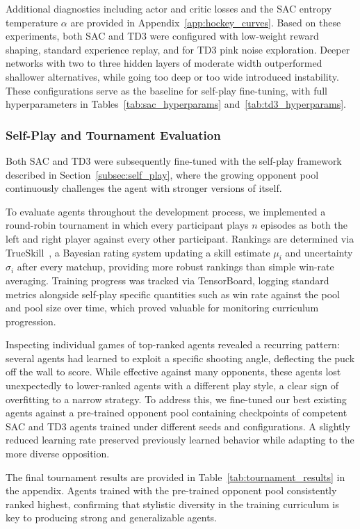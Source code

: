 Additional diagnostics including actor and critic losses and the \ac{SAC} entropy temperature 
$\alpha$ are provided in Appendix~\ref{app:hockey_curves}. Based on these experiments, 
both \ac{SAC} and \ac{TD3} were configured with low-weight reward shaping, standard experience 
replay, and for \ac{TD3} pink noise exploration. Deeper networks with two to three hidden 
layers of moderate width outperformed shallower alternatives, while going too deep or 
too wide introduced instability. These configurations serve as the baseline for 
self-play fine-tuning, with full hyperparameters in 
Tables~\ref{tab:sac_hyperparams} and~\ref{tab:td3_hyperparams}.

\subsubsection*{Self-Play and Tournament Evaluation}

Both \ac{SAC} and \ac{TD3} were subsequently fine-tuned with the self-play framework described 
in Section~\ref{subsec:self_play}, where the growing opponent pool continuously 
challenges the agent with stronger versions of itself.

To evaluate agents throughout the development process, we implemented a round-robin 
tournament in which every participant plays $n$ episodes as both the left and right 
player against every other participant. Rankings are determined via 
TrueSkill~\cite{herbrich2006trueskill}, a Bayesian rating system updating a skill 
estimate $\mu_i$ and uncertainty $\sigma_i$ after every matchup, providing more robust 
rankings than simple win-rate averaging. Training progress was tracked via TensorBoard, 
logging standard metrics alongside self-play specific quantities such as win rate 
against the pool and pool size over time, which proved valuable for monitoring 
curriculum progression.

\medskip
Inspecting individual games of top-ranked agents revealed a recurring pattern: several 
agents had learned to exploit a specific shooting angle, deflecting the puck off the 
wall to score. While effective against many opponents, these agents lost unexpectedly 
to lower-ranked agents with a different play style, a clear sign of overfitting to a 
narrow strategy. To address this, we fine-tuned our best existing agents against a 
pre-trained opponent pool containing checkpoints of competent \ac{SAC} and \ac{TD3} agents 
trained under different seeds and configurations. A slightly reduced learning rate 
preserved previously learned behavior while adapting to the more diverse opposition.

\medskip
The final tournament results are provided in Table~\ref{tab:tournament_results} in the 
appendix. Agents trained with the pre-trained opponent pool consistently ranked highest, 
confirming that stylistic diversity in the training curriculum is key to producing 
strong and generalizable agents.